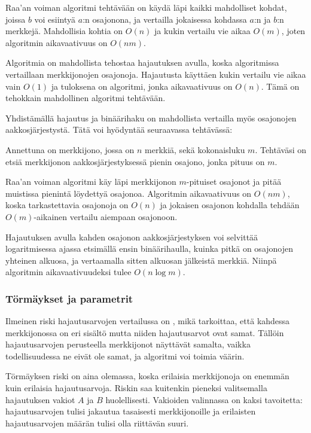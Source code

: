 Raa'an voiman algoritmi tehtävään
on käydä läpi kaikki mahdolliset kohdat,
joissa $b$ voi esiintyä $a$:n osajonona,
ja vertailla jokaisessa kohdassa $a$:n ja $b$:n merkkejä.
Mahdollisia kohtia on $O(n)$ ja kukin vertailu
vie aikaa $O(m)$, joten algoritmin aikavaativuus on $O(nm)$.

Algoritmia on mahdollista tehostaa hajautuksen avulla,
koska algoritmissa vertaillaan merkkijonojen osajonoja.
Hajautusta käyttäen kukin vertailu vie aikaa vain $O(1)$
ja tuloksena on algoritmi, jonka aikavaativuus on $O(n)$.
Tämä on tehokkain mahdollinen algoritmi tehtävään.

Yhdistämällä hajautus ja binäärihaku on mahdollista
vertailla myös osajonojen aakkosjärjestystä.
Tätä voi hyödyntää seuraavassa tehtävässä:

\begin{task}
Annettuna on merkkijono,
jossa on $n$ merkkiä,
sekä kokonaisluku $m$.
Tehtäväsi on etsiä merkkijonon
aakkosjärjestyksessä pienin osajono,
jonka pituus on $m$.
\end{task}

Raa'an voiman algoritmi käy läpi
merkkijonon $m$-pituiset osajonot
ja pitää muistissa pienintä löydettyä osajonoa.
Algoritmin aikavaativuus on $O(nm)$,
koska tarkastettavia osajonoja on $O(n)$ ja jokaisen osajonon kohdalla
tehdään $O(m)$-aikainen vertailu aiempaan osajonoon.

Hajautuksen avulla kahden osajonon
aakkosjärjestyksen voi selvittää logaritmisessa
ajassa etsimällä ensin binäärihaulla,
kuinka pitkä on osajonojen yhteinen alkuosa,
ja vertaamalla sitten alkuosan jälkeistä merkkiä.
Niinpä algoritmin aikavaativuudeksi tulee $O(n \log m)$.

\subsubsection*{Törmäykset ja parametrit}


Ilmeinen riski hajautusarvojen vertailussa
on , mikä tarkoittaa, että kahdessa merkkijonossa on
eri sisältö mutta niiden hajautusarvot ovat samat.
Tällöin hajautusarvojen perusteella merkkijonot
näyttävät samalta, vaikka todellisuudessa ne eivät ole samat,
ja algoritmi voi toimia väärin.

Törmäyksen riski on aina olemassa,
koska erilaisia merkkijonoja on enemmän kuin
erilaisia hajautusarvoja.
Riskin saa kuitenkin pieneksi valitsemalla
hajautuksen vakiot $A$ ja $B$ huolellisesti.
Vakioiden valinnassa on kaksi tavoitetta:
hajautusarvojen tulisi
jakautua tasaisesti merkkijonoille
ja
erilaisten hajautusarvojen määrän tulisi
olla riittävän suuri.

